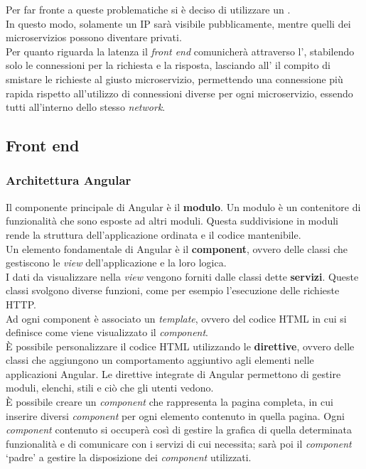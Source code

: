 \noindent Per far fronte a queste problematiche si è deciso di utilizzare un .\\
In questo modo, solamente un \gls{IP} sarà visibile pubblicamente, mentre quelli dei \glspl{microservizio} possono diventare privati.\\
Per quanto riguarda la latenza il \textit{front end} comunicherà attraverso l', stabilendo solo le connessioni per la richiesta e la risposta, lasciando all' il compito di smistare le richieste al giusto \gls{microservizio}, permettendo una connessione più rapida rispetto  all'utilizzo di connessioni diverse per ogni \gls{microservizio}, essendo tutti all'interno dello stesso \textit{network}.

\subsection{Front end}
\subsubsection{Architettura Angular}
Il componente principale di Angular è il \textbf{modulo}. Un modulo è un contenitore di funzionalità che sono esposte ad altri moduli. Questa suddivisione in moduli rende la struttura dell'applicazione ordinata e il codice mantenibile.\\
Un elemento fondamentale di Angular è il \textbf{component}, ovvero delle classi che gestiscono le \textit{view} dell'applicazione e la loro logica.\\
I dati da visualizzare nella \textit{view} vengono forniti dalle classi dette \textbf{servizi}. Queste classi svolgono diverse funzioni, come per esempio  l'esecuzione delle richieste HTTP.\\  
Ad ogni component è associato un \textit{template}, ovvero del codice HTML in cui si definisce come viene visualizzato il \textit{component}.\\
È possibile personalizzare il codice HTML utilizzando le \textbf{direttive}, ovvero delle classi che aggiungono un comportamento aggiuntivo agli elementi nelle applicazioni Angular. Le direttive integrate di Angular permettono di gestire moduli, elenchi, stili e ciò che gli utenti vedono.\\
È possibile creare un \textit{component} che rappresenta la pagina completa, in cui inserire diversi \textit{component} per ogni elemento contenuto in quella pagina.
Ogni \textit{component} contenuto si occuperà così di gestire la grafica di quella determinata funzionalità e di comunicare con i servizi di cui necessita; sarà poi il \textit{component} \enquote*{padre} a gestire la disposizione dei \textit{component} utilizzati. 
